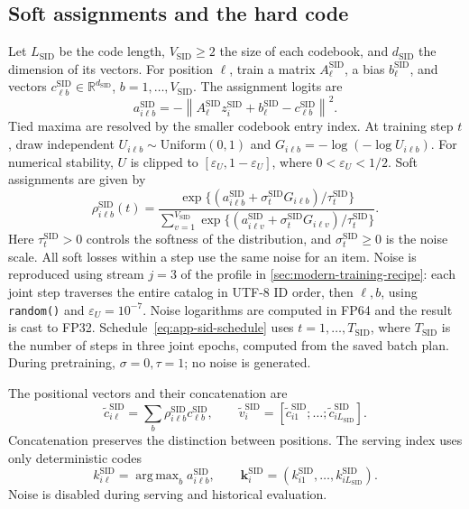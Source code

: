 \documentclass[12pt,a4paper]{article}
\newcommand{\code}[1]{{\ttfamily\small\nolinkurl{#1}}}
\newcommand{\R}{\mathbb R}
\newcommand{\eps}{\varepsilon}
\newcommand{\norm}[1]{\left\lVert#1\right\rVert}
\DeclareMathOperator*{\argmax}{arg\,max}
\theoremstyle{plainru}
\begin{document}
\subsection{Soft assignments and the hard code}
\label{sec:sid-codes}

Let $L_{\mathrm{SID}}$ be the code length,
$V_{\mathrm{SID}}\ge2$ the size of each codebook,
and $d_{\mathrm{SID}}$ the dimension of its vectors.
For position $\ell$, train a matrix $A_\ell^{\mathrm{SID}}$,
a bias $b_\ell^{\mathrm{SID}}$, and vectors
$c_{\ell b}^{\mathrm{SID}}\in\R^{d_{\mathrm{SID}}}$,
$b=1,\ldots,V_{\mathrm{SID}}$. The assignment logits are
\begin{equation}\label{eq:sid-logits}
 a_{i\ell b}^{\mathrm{SID}}
 =-\norm{A_\ell^{\mathrm{SID}}z_i^{\mathrm{SID}}
       +b_\ell^{\mathrm{SID}}-c_{\ell b}^{\mathrm{SID}}}^{2}.
\end{equation}
Tied maxima are resolved by the smaller codebook entry index.
At training step $t$, draw independent
$U_{i\ell b}\sim\mathrm{Uniform}(0,1)$ and
$G_{i\ell b}=-\log(-\log U_{i\ell b})$.
For numerical stability, $U$ is clipped to
$[\eps_U,1-\eps_U]$, where $0<\eps_U<1/2$.
Soft assignments are given by
\begin{equation}\label{eq:sid-soft}
 \rho_{i\ell b}^{\mathrm{SID}}(t)=
 \frac{\exp\{(a_{i\ell b}^{\mathrm{SID}}
                 +\sigma_t^{\mathrm{SID}}G_{i\ell b})/
                    \tau_t^{\mathrm{SID}}\}}
 {\sum_{v=1}^{V_{\mathrm{SID}}}
  \exp\{(a_{i\ell v}^{\mathrm{SID}}
                 +\sigma_t^{\mathrm{SID}}G_{i\ell v})/
                    \tau_t^{\mathrm{SID}}\}}.
\end{equation}
Here $\tau_t^{\mathrm{SID}}>0$ controls the softness of the distribution,
and $\sigma_t^{\mathrm{SID}}\ge0$ is the noise scale.
All soft losses within a step use the same noise for an item.
Noise is reproduced using stream $j=3$ of the profile in
\ref{sec:modern-training-recipe}: each joint step traverses the entire
catalog in UTF-8 ID order, then $\ell,b$, using \code{random()} and
$\eps_U=10^{-7}$. Noise logarithms are computed in FP64 and the result is cast
to FP32. Schedule~\eqref{eq:app-sid-schedule} uses
$t=1,\ldots,T_{\mathrm{SID}}$, where $T_{\mathrm{SID}}$ is the number of steps
in three joint epochs, computed from the saved batch plan.
During pretraining, $\sigma=0,\tau=1$; no noise is generated.

The positional vectors and their concatenation are
\begin{equation}\label{eq:sid-soft-vector}
 \widetilde c_{i\ell}^{\mathrm{SID}}
 =\sum_b\rho_{i\ell b}^{\mathrm{SID}}c_{\ell b}^{\mathrm{SID}},
 \qquad
 \widetilde v_i^{\mathrm{SID}}
 =[\widetilde c_{i1}^{\mathrm{SID}};\ldots;
   \widetilde c_{iL_{\mathrm{SID}}}^{\mathrm{SID}}].
\end{equation}
Concatenation preserves the distinction between positions. The serving index
uses only deterministic codes
\begin{equation}\label{eq:sid-hard}
 k_{i\ell}^{\mathrm{SID}}=\argmax_b a_{i\ell b}^{\mathrm{SID}},
 \qquad
 \mathbf k_i^{\mathrm{SID}}
 =(k_{i1}^{\mathrm{SID}},\ldots,k_{iL_{\mathrm{SID}}}^{\mathrm{SID}}).
\end{equation}
Noise is disabled during serving and historical evaluation.
\end{document}
